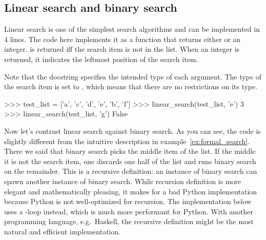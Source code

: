 \begin{programming}
\label{sec:formal_code}

\subsection{Linear search and binary search}
\label{ssec:formal_code_search}

Linear search is one of the simplest search algorithms and can be implemented in 4 lines.
The code here implements it as a function that returns either  or an integer.
 is returned iff the search item is not in the list.
When an integer is returned, it indicates the leftmost position of the search item.

Note that the docstring specifies the intended type of each argument.
The type of the search item is set to , which means that there are no restrictions on its type.

\begin{center}
\end{center}
\begin{center}
    \begin{pythoncode}
        >>> test_list = ['a', 'c', 'd', 'e', 'b', 'f']
        >>> linear_search(test_list, 'e')
        3
        >>> linear_search(test_list, 'g')
        False
    \end{pythoncode}
\end{center}



Now let's contrast linear search against binary search.
As you can see, the code is slightly different from the intuitive description in example~\ref{ex:formal_search}.
There we said that binary search picks the middle item of the list.
If the middle it is not the search item, one discards one half of the list and runs binary search on the remainder.
This is a recursive definition: an instance of binary search can spawn another instance of binary search.
While recursion definition is more elegant and mathematically pleasing, it makes for a bad Python implementation because Python is not well-optimized for recursion.
The implementation below uses a -loop instead, which is much more performant for Python.
With another programming language, e.g.~Haskell, the recursive definition might be the most natural and efficient implementation.


\end{programming}
